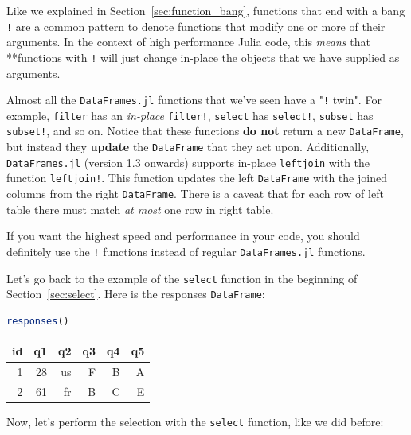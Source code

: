\documentclass[
  notoc %
]{tufte-book}
\newcommand{\passthrough}[1]{#1}
\begin{document}
Like we explained in Section~\ref{sec:function_bang}, functions that end
with a bang \passthrough{\lstinline"!"} are a common pattern to denote
functions that modify one or more of their arguments. In the context of
high performance Julia code, this \emph{means} that **functions with
\passthrough{\lstinline"!"} will just change in-place the objects that
we have supplied as arguments.

Almost all the \passthrough{\lstinline!DataFrames.jl!} functions that
we've seen have a "\passthrough{\lstinline"!"} twin". For example,
\passthrough{\lstinline!filter!} has an \emph{in-place}
\passthrough{\lstinline"filter!"}, \passthrough{\lstinline!select!} has
\passthrough{\lstinline"select!"}, \passthrough{\lstinline!subset!} has
\passthrough{\lstinline"subset!"}, and so on. Notice that these
functions \textbf{do not} return a new
\passthrough{\lstinline!DataFrame!}, but instead they \textbf{update}
the \passthrough{\lstinline!DataFrame!} that they act upon.
Additionally, \passthrough{\lstinline!DataFrames.jl!} (version 1.3
onwards) supports in-place \passthrough{\lstinline!leftjoin!} with the
function \passthrough{\lstinline"leftjoin!"}. This function updates the
left \passthrough{\lstinline!DataFrame!} with the joined columns from
the right \passthrough{\lstinline!DataFrame!}. There is a caveat that
for each row of left table there must match \emph{at most} one row in
right table.

If you want the highest speed and performance in your code, you should
definitely use the \passthrough{\lstinline"!"} functions instead of
regular \passthrough{\lstinline!DataFrames.jl!} functions.

Let's go back to the example of the \passthrough{\lstinline!select!}
function in the beginning of Section~\ref{sec:select}. Here is the
responses \passthrough{\lstinline!DataFrame!}:

\begin{lstlisting}[language=Julia]
responses()
\end{lstlisting}

\begin{longtable}[]{@{}rrrrrr@{}}
\toprule
id & q1 & q2 & q3 & q4 & q5 \\
\midrule
\endhead
1 & 28 & us & F & B & A \\
2 & 61 & fr & B & C & E \\
\bottomrule
\end{longtable}

Now, let's perform the selection with the
\passthrough{\lstinline!select!} function, like we did before:
\end{document}
